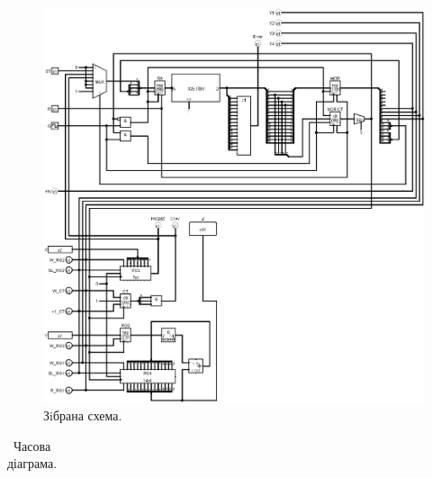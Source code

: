 \documentclass[a4paper, 10pt]{article}
\begin{document}
\begin{figure}[H]
\begin{center}
\includegraphics[scale=0.4, angle=90]{lab2.png}
\caption{Зiбрана схема.}
\end{center}
\end{figure}


\begin{table}[h!]
\tiny
\centering
\setlength{\tabcolsep}{1pt}
\begin{tabular}{|c|c|c|c|c|c|c|c|c|c|c|c|c|c|c|c|c|c|c|c|c|}
\hline

\end{tabular}
\caption{Часова діаграма.}
\end{table}
\end{document}
